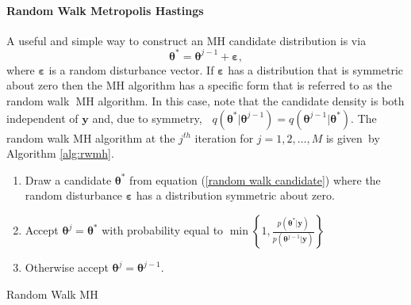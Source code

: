 \documentclass[article]{jss}
\begin{document}
\paragraph{Random Walk Metropolis Hastings \protect \protect \\
}

A useful and simple way to construct an MH candidate distribution is
via\begin{equation}
  \bm{\theta}^{\ast}=\bm{\theta}^{j-1}+\bm{\bm{\varepsilon}},\label{random
    walk candidate}\end{equation} where $\bm{\varepsilon}$ is a random
disturbance vector. If $\bm{\varepsilon}$ has a distribution that is
symmetric about zero then the MH algorithm has a specific form that is
referred to as the random walk\textbf{\ }MH algorithm. In this case,
note that the candidate density is both independent of $\bm{y}$ and,
due to symmetry, \textbf{\
}$q\left(\bm{\theta}^{\ast}|\bm{\theta}^{j-1}\right)=q\left(\bm{\theta}^{j-1}|\bm{\theta}^{\ast}\right)$.
The random walk MH algorithm at the $j^{th}$ iteration for
$j=1,2,\ldots,M$ is given\emph{\ }by Algorithm \ref{alg:rwmh}.

%
\begin{algorithm}[H]
  \begin{enumerate}
  \item Draw a candidate $\bm{\theta}^{\ast}$ from equation
    (\ref{random walk candidate}) where the random disturbance
    $\bm{\varepsilon}$ has a distribution symmetric about zero.
  \item Accept $\bm{\theta}^{j}=\bm{\theta}^{\ast}$ with probability
    equal to $\min\left\{
      1,\frac{p\left(\bm{\theta}^{\ast}|\bm{y}\right)}{p\left(\bm{\theta}^{j-1}|\bm{y}\right)}\right\}
    $
  \item Otherwise accept $\bm{\theta}^{j}=\bm{\theta}^{j-1}.$
  \end{enumerate}
  \caption{Random Walk MH}
\label{alg:rwmh}
\end{algorithm}
\end{document}

